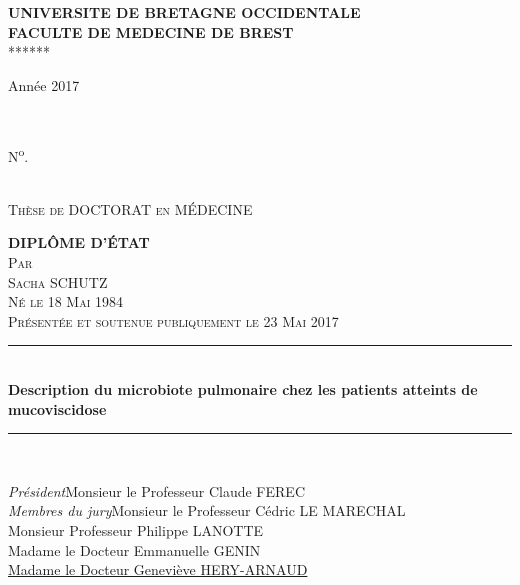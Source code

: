 \documentclass[12pt,a4paper]{article}
\newcommand{\HRule}{\rule{\linewidth}{0.5mm}} %
\begin{document}
\begin{titlepage}
\centering
\Large \textbf{UNIVERSITE DE BRETAGNE OCCIDENTALE \\
FACULTE DE MEDECINE DE BREST}\\
******


\begin{minipage}{0.4\textwidth}
 \begin{flushleft} \large
     Année 2017
 \end{flushleft}
\end{minipage}
~
\begin{minipage}{0.5\textwidth}
 \begin{flushright} \large
    N\textsuperscript{o}.
 \end{flushright}
\end{minipage}\\[0.2cm]
\center
\textsc{\large Thèse de DOCTORAT en MÉDECINE }


\textsc{\Large \textbf{DIPLÔME D'ÉTAT}}\\[0.1cm]
\textsc{\large Par}\\[0.1cm]
\textsc{\Large Sacha SCHUTZ} \\[0.1cm]
\textsc{\normalsize Né le 18 Mai 1984} \\[0.1cm]
\textsc{\normalsize Présentée et soutenue publiquement le 23 Mai 2017}\\[1.0cm]


\HRule \\[0.5cm]

{ \huge \bfseries Description du microbiote pulmonaire chez les patients atteints de mucoviscidose}\\[0.4cm]

\HRule \\[3.5cm]

 \begin{flushleft} \large
      \emph{Président}\hspace{2.89cm}Monsieur le Professeur Claude FEREC\\[0.4cm]
      \emph{Membres du jury}\hspace{1.3cm}Monsieur le Professeur Cédric LE MARECHAL\\
       \hspace*{5cm}Monsieur Professeur Philippe LANOTTE\\
       \hspace*{5cm}Madame le Docteur Emmanuelle GENIN\\
       \hspace*{5cm}\underline{Madame le Docteur Geneviève HERY-ARNAUD} \\
\end{flushleft}


\vfill %
\restoregeometry
\end{titlepage}
\end{document}
